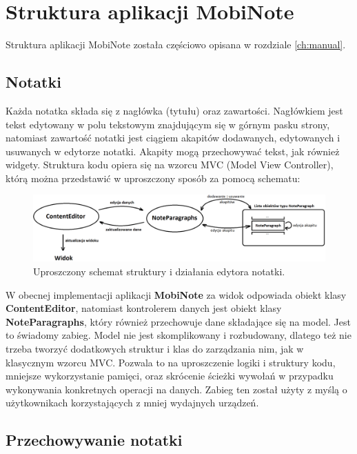 \chapter{Struktura aplikacji MobiNote}

Struktura aplikacji MobiNote została częściowo opisana w rozdziale \ref{ch:manual}.

\section{Notatki}

Każda notatka składa się z nagłówka (tytułu) oraz zawartości.
Nagłówkiem jest tekst edytowany w polu tekstowym znajdującym się w górnym pasku strony, natomiast zawartość notatki jest ciągiem akapitów dodawanych, edytowanych i usuwanych w edytorze notatki. Akapity mogą przechowywać tekst, jak również widgety. Struktura kodu opiera się na wzorcu MVC (Model View Controller), którą można przedstawić w uproszczony sposób za pomocą schematu:

\begin{figure}[ht]
    \centering
    \includegraphics[width=\linewidth]{images/ContentEditor_podzial.png}
    \caption{Uproszczony schemat struktury i działania edytora notatki.}
\end{figure}

W obecnej implementacji aplikacji \textbf{MobiNote} za widok odpowiada obiekt klasy \textbf{ContentEditor}, natomiast kontrolerem danych jest obiekt klasy \textbf{NoteParagraphs}, który również przechowuje dane składające się na model. Jest to świadomy zabieg. Model nie jest skomplikowany i rozbudowany, dlatego też nie trzeba tworzyć dodatkowych struktur i klas do zarządzania nim, jak w klasycznym wzorcu MVC. Pozwala to na uproszczenie logiki i struktury kodu, mniejsze wykorzystanie pamięci, oraz skrócenie ścieżki wywołań w przypadku wykonywania konkretnych operacji na danych. Zabieg ten został użyty z myślą o użytkownikach korzystających z mniej wydajnych urządzeń.

\section{Przechowywanie notatki}

